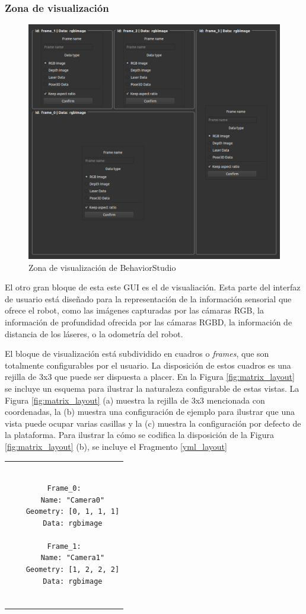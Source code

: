 \subsubsection{Zona de visualización}

\begin{figure}
  \centering
  \includegraphics[width=.6\linewidth]{img/layout}
  \caption{Zona de visualización de BehaviorStudio}
  \label{fig:layout}
\end{figure}

El otro gran bloque de esta este GUI es el de visualiación. Esta parte del interfaz de usuario está diseñado para la representación de la información sensorial que ofrece el robot, como las imágenes capturadas por las cámaras RGB, la información de profundidad ofrecida por las cámaras RGBD, la información de distancia de los láseres, o la odometría del robot. 

El bloque de visualización está subdividido en cuadros o \textit{frames}, que son totalmente configurables por el usuario. La disposición de estos cuadros es una rejilla de 3x3 que puede ser dispuesta a placer. En la Figura \ref{fig:matrix_layout} se incluye un esquema para ilustrar la naturaleza configurable de estas vistas. La Figura \ref{fig:matrix_layout} (a) muestra la rejilla de 3x3 mencionada con coordenadas, la (b) muestra una configuración de ejemplo para ilustrar que una vista puede ocupar varias casillas y la (c) muestra la configuración por defecto de la plataforma. Para ilustrar la cómo se codifica la disposición de la Figura \ref{fig:matrix_layout} (b), se incluye el Fragmento \ref{yml_layout}

\begin{tabular}{c}
\begin{lstlisting}[caption={Ejemplo de configuración de la visualización},label=yml_layout] 

Frame_0:
    Name: "Camera0"
    Geometry: [0, 1, 1, 1]
    Data: rgbimage

Frame_1:
    Name: "Camera1"
    Geometry: [1, 2, 2, 2]
    Data: rgbimage
    
\end{lstlisting}
\end{tabular}

